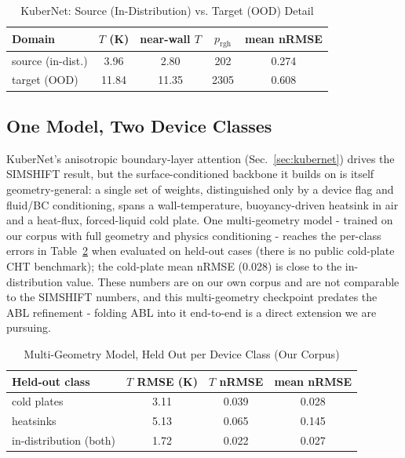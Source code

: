 \documentclass[conference]{IEEEtran}
\begin{document}
\begin{table}[t]\renewcommand{\arraystretch}{1.2}
\caption{KuberNet: Source (In-Distribution) vs. Target (OOD) Detail}
\label{tab:srctgt}\centering
\begin{tabular}{@{}lcccc@{}}\toprule
Domain & $T$ (K) & near-wall $T$ & $p_{\mathrm{rgh}}$ & mean nRMSE \\ \midrule
source (in-dist.) & 3.96 & 2.80 & 202 & 0.274 \\
target (OOD) & 11.84 & 11.35 & 2305 & 0.608 \\ \bottomrule
\end{tabular}
\end{table}

\subsection{One Model, Two Device Classes}
KuberNet's anisotropic boundary-layer attention (Sec.~\ref{sec:kubernet}) drives the SIMSHIFT result, but
the surface-conditioned backbone it builds on is itself geometry-general: a single set of weights,
distinguished only by a device flag and fluid/BC conditioning, spans a wall-temperature, buoyancy-driven
heatsink in air and a heat-flux, forced-liquid cold plate. One multi-geometry model - trained on our corpus
with full geometry and physics conditioning - reaches the per-class errors in Table~\ref{tab:multi} when
evaluated on held-out cases (there is no public cold-plate CHT benchmark); the cold-plate mean nRMSE (0.028)
is close to the in-distribution value. These numbers are on our own corpus and are not comparable to the
SIMSHIFT numbers, and this multi-geometry checkpoint predates the ABL refinement - folding ABL into it
end-to-end is a direct extension we are pursuing.

\begin{table}[t]\renewcommand{\arraystretch}{1.2}
\caption{Multi-Geometry Model, Held Out per Device Class (Our Corpus)}
\label{tab:multi}\centering
\begin{tabular}{@{}lccc@{}}\toprule
Held-out class & $T$ RMSE (K) & $T$ nRMSE & mean nRMSE \\ \midrule
cold plates & 3.11 & 0.039 & 0.028 \\
heatsinks & 5.13 & 0.065 & 0.145 \\
in-distribution (both) & 1.72 & 0.022 & 0.027 \\ \bottomrule
\end{tabular}
\end{table}
\end{document}
